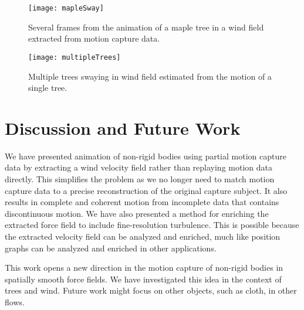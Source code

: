 \begin{figure*}[!t]
\centering
\texttt{[image: mapleSway]}
\caption[Maple animation.]{Several frames from the animation of a maple tree in a wind field extracted from motion capture data.}
\label{fig:mapleSway}
\end{figure*}

\begin{figure}[!t]
\centering
\texttt{[image: multipleTrees]}
\caption[Multiple trees swaying. ]{Multiple trees swaying in wind field estimated from the motion of a single tree.}
\label{fig:multipleTrees}
\end{figure}

\section{Discussion and Future Work}

We have presented animation of non-rigid bodies using partial motion capture data by extracting a wind velocity field rather than replaying motion data directly. This simplifies the problem as we no longer need to match motion capture data to a precise reconstruction of the original capture subject. It also results in complete and coherent motion from incomplete data that contains discontinuous motion. We have also presented a method for enriching the extracted force field to include fine-resolution turbulence. This is possible because the extracted velocity field can be analyzed and enriched, much like position graphs can be analyzed and enriched in other applications.  

This work opens a new direction in the motion capture of non-rigid bodies in spatially smooth force fields. We have investigated this idea in the context of trees and wind. Future work might focus on other objects, such as cloth, in other flows.
